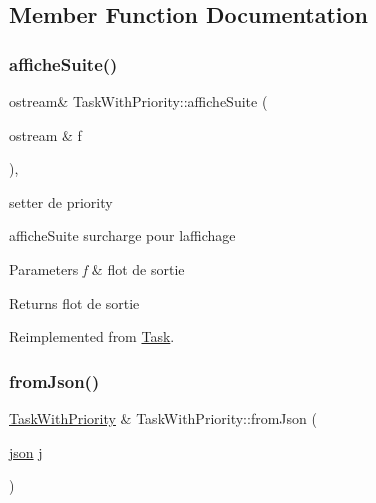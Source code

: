 \subsection{Member Function Documentation}
\mbox{\label{classTaskWithPriority_abba0d3458bd4ef1aed57ddd0d0cbe233}} 
\subsubsection{\texorpdfstring{affiche\+Suite()}{afficheSuite()}}
{\footnotesize\ttfamily ostream\& Task\+With\+Priority\+::affiche\+Suite (\begin{DoxyParamCaption}\item[{ostream \&}]{f }\end{DoxyParamCaption})\hspace{0.3cm}{\ttfamily [inline]}, {\ttfamily [virtual]}}



setter de priority 

affiche\+Suite surcharge pour l\textquotesingle{}affichage 
\begin{DoxyParams}{Parameters}
{\em f} & flot de sortie \\
\hline
\end{DoxyParams}
\begin{DoxyReturn}{Returns}
flot de sortie 
\end{DoxyReturn}


Reimplemented from \hyperlink{classTask_aaef115655e5c20b9919da726ae526f8a}{Task}.

\mbox{\label{classTaskWithPriority_ad198d3bb6af6f3e7e10518cabc08bf1f}} 
\subsubsection{\texorpdfstring{from\+Json()}{fromJson()}}
{\footnotesize\ttfamily \hyperlink{classTaskWithPriority}{Task\+With\+Priority} \& Task\+With\+Priority\+::from\+Json (\begin{DoxyParamCaption}\item[{\hyperlink{classnlohmann_1_1basic__json}{json}}]{j }\end{DoxyParamCaption})\hspace{0.3cm}{\ttfamily [static]}}



